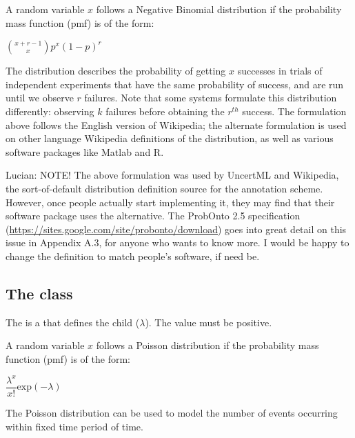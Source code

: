 A random variable $ x $ follows a Negative Binomial distribution if the probability mass function (pmf) is of the form:

\begin{center}
${x + r - 1 \choose x} p^x (1-p)^r $
\end{center}

The distribution describes the probability of getting $ x $ successes in trials of independent experiments that have the same probability of success, and are run until we observe $ r $ failures.  Note that some systems formulate this distribution differently:  observing $k$ failures before obtaining the $r^{th}$ success.  The formulation above follows the English version of Wikipedia; the alternate formulation is used on other language Wikipedia definitions of the distribution, as well as various software packages like Matlab and R.

{\color{red} Lucian: \controversial NOTE!  The above formulation was used by UncertML and Wikipedia, the sort-of-default distribution definition source for the annotation scheme.  However, once people actually start implementing it, they may find that their software package uses the alternative.  The ProbOnto 2.5 specification (\url{https://sites.google.com/site/probonto/download}) goes into great detail on this issue in Appendix A.3, for anyone who wants to know more.  I would be happy to change the definition to match people's software, if need be.}


\subsection{The  class}
\label{PoissonDistribution-class}
\label{poissondistribution-class}

The \PoissonDistribution is a \DiscreteUnivariateDistribution that defines the \UncertValue child  ($\lambda$).  The  value must be positive.

A random variable $ x $ follows a Poisson distribution if the probability mass function (pmf) is of the form:

\begin{center}
$\dfrac{\lambda^x}{x!} \mathrm{exp}(-\lambda)$
\end{center}

The Poisson distribution can be used to model the number of events occurring within fixed time period of time.


